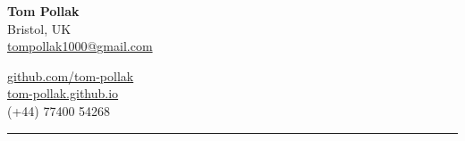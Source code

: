 \documentclass{structure}
\begin{document}
\parbox{0.5\textwidth}{
    {\namesize\textbf{Tom Pollak}} \\[6pt]
    Bristol, UK\\
    \href{mailto:tompollak1000@gmail.com}{tompollak1000@gmail.com}
}
\hfill
\parbox{0.5\textwidth}{
    \vspace*{10pt}

    \begin{flushright}

        \href{https://github.com/tom-pollak}{github.com/tom-pollak} \\
        \href{https://tom-pollak.github.io}{tom-pollak.github.io} \\
        (+44) 77400 54268
    \end{flushright}

}

\smallskip
\hrule
\smallskip

\end{document}
